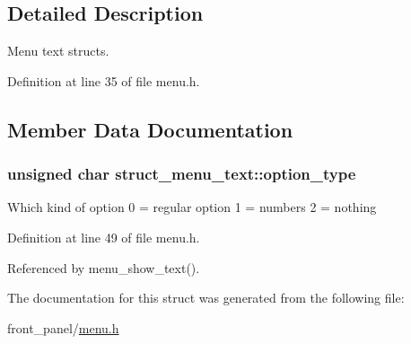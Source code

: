 \subsection{Detailed Description}
Menu text structs. 

Definition at line 35 of file menu.h.

\subsection{Member Data Documentation}
\hypertarget{structstruct__menu__text_a94d1bfe259ef142214b361cbe0ccd7c}{
\subsubsection[{option\_\-type}]{\setlength{\rightskip}{0pt plus 5cm}unsigned char {\bf struct\_\-menu\_\-text::option\_\-type}}}
\label{structstruct__menu__text_a94d1bfe259ef142214b361cbe0ccd7c}


Which kind of option 0 = regular option 1 = numbers 2 = nothing 

Definition at line 49 of file menu.h.

Referenced by menu\_\-show\_\-text().

The documentation for this struct was generated from the following file:\begin{CompactItemize}
\item 
front\_\-panel/\hyperlink{menu_8h}{menu.h}\end{CompactItemize}
